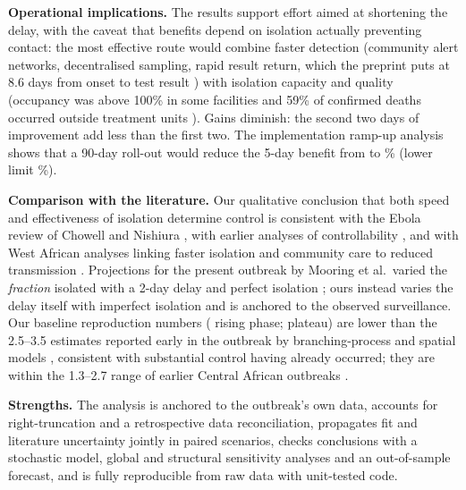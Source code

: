\documentclass[11pt,a4paper]{article}
\begin{document}
\textbf{Operational implications.} The results support effort aimed at shortening the delay, with the caveat that benefits depend on isolation actually preventing contact: the most effective route would combine faster detection (community alert networks, decentralised sampling, rapid result return, which the preprint puts at 8.6 days from onset to test result \citep{ebengo2026}) with isolation capacity and quality (occupancy was above 100\% in some facilities and 59\% of confirmed deaths occurred outside treatment units \citep{kabasele2026}). Gains diminish: the second two days of improvement add less than the first two. The implementation ramp-up analysis shows that a 90-day roll-out would reduce the 5-day benefit from \pctMedEightyFive{} to \varRampNinetyFive\% (lower limit \varRampNinetyUiLo\%).

\textbf{Comparison with the literature.} Our qualitative conclusion that both speed and effectiveness of isolation determine control is consistent with the Ebola review of Chowell and Nishiura \citep{chowell2014}, with earlier analyses of controllability \citep{fraser2004,lipsitch2003}, and with West African analyses linking faster isolation and community care to reduced transmission \citep{pandey2014,kucharski2015,faye2015}. Projections for the present outbreak by Mooring et al.\ varied the \emph{fraction} isolated with a 2-day delay and perfect isolation \citep{mooring2026}; ours instead varies the delay itself with imperfect isolation and is anchored to the observed surveillance. Our baseline reproduction numbers (\fitBReBeforeMed{} rising phase; \fitBReAfterMed{} plateau) are lower than the 2.5--3.5 estimates reported early in the outbreak by branching-process and spatial models \citep{mooring2026,ebengo2026}, consistent with substantial control having already occurred; they are within the 1.3--2.7 range of earlier Central African outbreaks \citep{chowell2014,lekone2006,legrand2007}.

\textbf{Strengths.} The analysis is anchored to the outbreak's own data, accounts for right-truncation and a retrospective data reconciliation, propagates fit and literature uncertainty jointly in paired scenarios, checks conclusions with a stochastic model, global and structural sensitivity analyses and an out-of-sample forecast, and is fully reproducible from raw data with unit-tested code.
\end{document}
